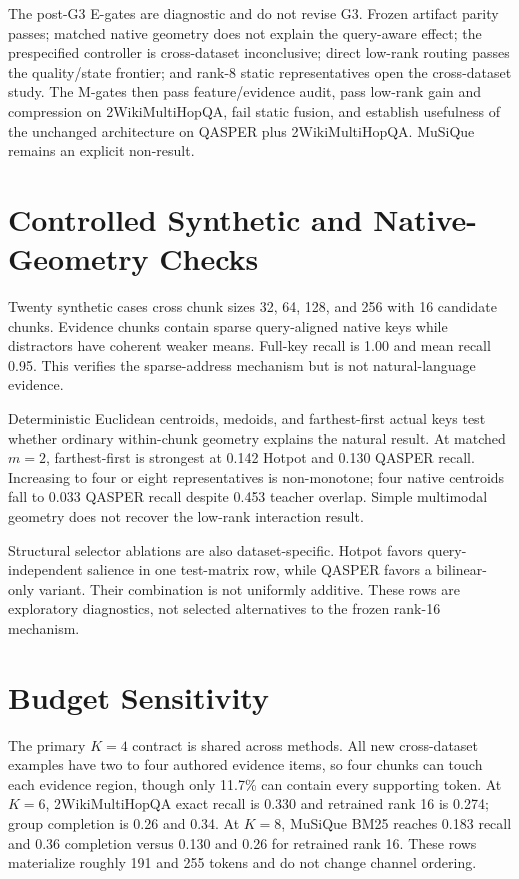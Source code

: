 \documentclass[11pt]{article}
\newcommand{\twowiki}{2WikiMultiHopQA\xspace}
\newcommand{\musique}{MuSiQue\xspace}
\begin{document}
The post-G3 E-gates are diagnostic and do not revise G3. Frozen artifact parity
passes; matched native geometry does not explain the query-aware effect; the
prespecified controller is cross-dataset inconclusive; direct low-rank routing
passes the quality/state frontier; and rank-8 static representatives open the
cross-dataset study. The M-gates then pass feature/evidence audit, pass low-rank
gain and compression on \twowiki, fail static fusion, and establish usefulness
of the unchanged architecture on QASPER plus \twowiki. MuSiQue remains an
explicit non-result.

\section{Controlled Synthetic and Native-Geometry Checks}
Twenty synthetic cases cross chunk sizes 32, 64, 128, and 256 with 16 candidate
chunks. Evidence chunks contain sparse query-aligned native keys while
distractors have coherent weaker means. Full-key recall is 1.00 and mean recall
0.95. This verifies the sparse-address mechanism but is not natural-language
evidence.

Deterministic Euclidean centroids, medoids, and farthest-first actual keys test
whether ordinary within-chunk geometry explains the natural result. At matched
$m=2$, farthest-first is strongest at 0.142 Hotpot and 0.130 QASPER recall.
Increasing to four or eight representatives is non-monotone; four native
centroids fall to 0.033 QASPER recall despite 0.453 teacher overlap. Simple
multimodal geometry does not recover the low-rank interaction result.

Structural selector ablations are also dataset-specific. Hotpot favors
query-independent salience in one test-matrix row, while QASPER favors a
bilinear-only variant. Their combination is not uniformly additive. These rows
are exploratory diagnostics, not selected alternatives to the frozen rank-16
mechanism.

\section{Budget Sensitivity}
The primary $K=4$ contract is shared across methods. All new cross-dataset
examples have two to four authored evidence items, so four chunks can touch
each evidence region, though only 11.7\% can contain every supporting token.
At $K=6$, \twowiki exact recall is 0.330 and retrained rank 16 is 0.274; group
completion is 0.26 and 0.34. At $K=8$, \musique BM25 reaches 0.183 recall and
0.36 completion versus 0.130 and 0.26 for retrained rank 16. These rows
materialize roughly 191 and 255 tokens and do not change channel ordering.
\end{document}
